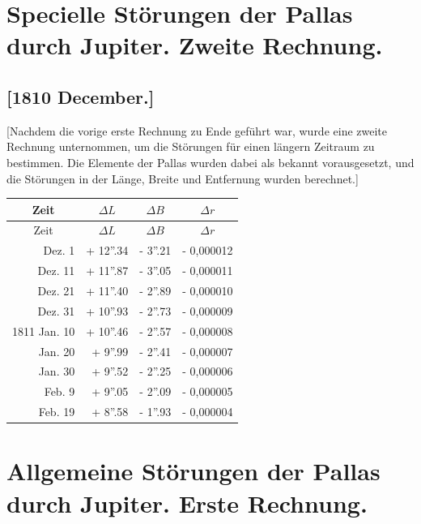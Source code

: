 \documentclass[12pt,a4paper]{article}
\begin{document}
\newpage
\section*{Specielle St\"{o}rungen der Pallas durch Jupiter. Zweite Rechnung.}

\subsection*{[1810 December.]}

[Nachdem die vorige erste Rechnung zu Ende gef\"{u}hrt war, wurde eine zweite Rechnung unternommen, um die St\"{o}rungen f\"{u}r einen l\"{a}ngern Zeitraum zu bestimmen. Die Elemente der Pallas wurden dabei als bekannt vorausgesetzt, und die St\"{o}rungen in der L\"{a}nge, Breite und Entfernung wurden berechnet.]

\begin{longtable}{|r|r|r|r|}
\hline
\multicolumn{1}{|c|}{Zeit} & \multicolumn{1}{c|}{$\Delta L$} & \multicolumn{1}{c|}{$\Delta B$} & \multicolumn{1}{c|}{$\Delta r$} \\
\hline
\endfirsthead
\hline
\multicolumn{1}{|c|}{Zeit} & \multicolumn{1}{c|}{$\Delta L$} & \multicolumn{1}{c|}{$\Delta B$} & \multicolumn{1}{c|}{$\Delta r$} \\
\hline
\endhead
\hline
\endfoot
1810 Dez. 1 & + 12''.34 & - 3''.21 & - 0,000012 \\
Dez. 11 & + 11''.87 & - 3''.05 & - 0,000011 \\
Dez. 21 & + 11''.40 & - 2''.89 & - 0,000010 \\
Dez. 31 & + 10''.93 & - 2''.73 & - 0,000009 \\
1811 Jan. 10 & + 10''.46 & - 2''.57 & - 0,000008 \\
Jan. 20 & + 9''.99 & - 2''.41 & - 0,000007 \\
Jan. 30 & + 9''.52 & - 2''.25 & - 0,000006 \\
Feb. 9 & + 9''.05 & - 2''.09 & - 0,000005 \\
Feb. 19 & + 8''.58 & - 1''.93 & - 0,000004 \\
\hline
\end{longtable}

\newpage
\section*{Allgemeine St\"{o}rungen der Pallas durch Jupiter. Erste Rechnung.}
\end{document}
